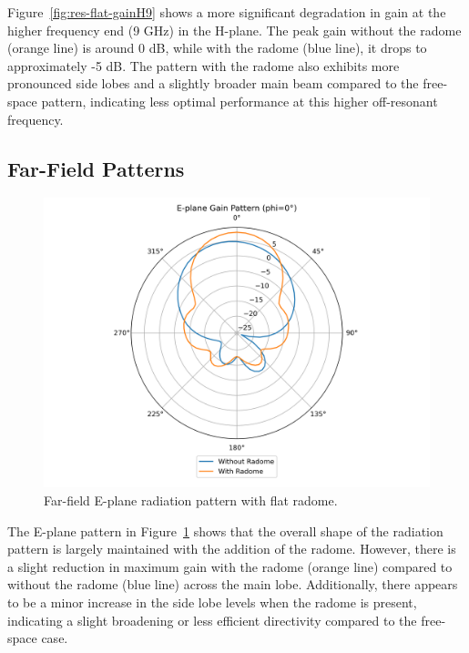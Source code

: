 Figure~\ref{fig:res-flat-gainH9} shows a more significant degradation in gain at the higher frequency end (9 GHz) in the H-plane. The peak gain without the radome (orange line) is around 0 dB, while with the radome (blue line), it drops to approximately -5 dB. The pattern with the radome also exhibits more pronounced side lobes and a slightly broader main beam compared to the free-space pattern, indicating less optimal performance at this higher off-resonant frequency.

\subsection{Far-Field Patterns}

\begin{figure}[H]
\centering
\includegraphics[width=1.0\textwidth]{figures/comparison_flat_radome/gain_E_polar.png}
\caption{Far-field E-plane radiation pattern with flat radome.}
\label{fig:res-flat-eplane}
\end{figure}

The E-plane pattern in Figure~\ref{fig:res-flat-eplane} shows that the overall shape of the radiation pattern is largely maintained with the addition of the radome. However, there is a slight reduction in maximum gain with the radome (orange line) compared to without the radome (blue line) across the main lobe. Additionally, there appears to be a minor increase in the side lobe levels when the radome is present, indicating a slight broadening or less efficient directivity compared to the free-space case.

